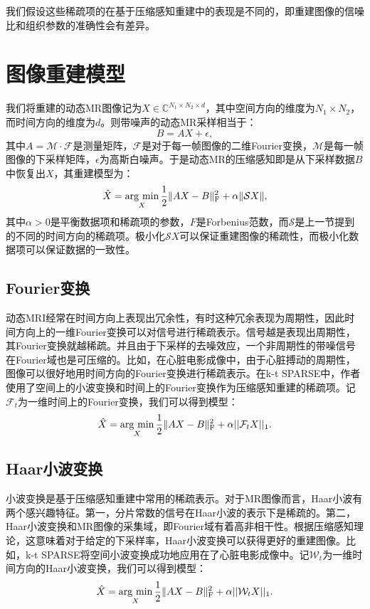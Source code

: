 我们假设这些稀疏项的在基于压缩感知重建中的表现是不同的，即重建图像的信噪比和组织参数的准确性会有差异。

\section{图像重建模型}
我们将重建的动态MR图像记为$X\in \mathbb{C}^{N_1\times N_2\times d}$，其中空间方向的维度为$N_1\times N_2$，而时间方向的维度为$d$。则带噪声的动态MR采样相当于：
$$B=AX+\epsilon,$$
其中$A=\mathcal{M}\cdot \mathcal{F}$是测量矩阵，$\mathcal{F}$是对于每一帧图像的二维Fourier变换，$\mathcal{M}$是每一帧图像的下采样矩阵，$\epsilon$为高斯白噪声。于是动态MR的压缩感知即是从下采样数据$B$中恢复出$X$，其重建模型为：
\begin{equation}
\hat{X} = \argmin_X \frac{1}{2}\|AX-B\|_\mathrm{F}^2 + \alpha\|\mathcal{S}X\|,
\end{equation}
其中$\alpha>0$是平衡数据项和稀疏项的参数，$F$是Forbenius范数，而$\mathcal{S}$是上一节提到的不同的时间方向的稀疏项。极小化$\mathcal{S}X$可以保证重建图像的稀疏性，而极小化数据项可以保证数据的一致性。

\subsection{Fourier变换}
动态MRI经常在时间方向上表现出冗余性，有时这种冗余表现为周期性，因此时间方向上的一维Fourier变换可以对信号进行稀疏表示。信号越是表现出周期性，其Fourier变换就越稀疏。并且由于下采样的去噪效应，一个非周期性的带噪信号在Fourier域也是可压缩的。比如，在心脏电影成像中，由于心脏搏动的周期性，图像可以很好地用时间方向的Fourier变换进行稀疏表示。在k-t SPARSE\cite{Lustig2010Sparse}中，作者使用了空间上的小波变换和时间上的Fourier变换作为压缩感知重建的稀疏项。记$\mathcal{F}_t$为一维时间上的Fourier变换，我们可以得到模型：
\begin{equation}
\hat{X} = \argmin_X \frac{1}{2}\|AX-B\|_\mathrm{F}^2 + \alpha ||\mathcal{F}_t X||_1.
\end{equation}

\subsection{Haar小波变换}
小波变换是基于压缩感知重建中常用的稀疏表示。对于MR图像而言，Haar小波有两个感兴趣特征。第一，分片常数的信号在Haar小波的表示下是稀疏的。第二，Haar小波变换和MR图像的采集域，即Fourier域有着高非相干性。根据压缩感知理论，这意味着对于给定的下采样率，Haar小波变换可以获得更好的重建图像。比如，k-t SPARSE\cite{Lustig2010Sparse}将空间小波变换成功地应用在了心脏电影成像中。记$\mathcal{W}_t$为一维时间方向的Haar小波变换，我们可以得到模型：
\begin{equation}
\hat{X} = \argmin_X \frac{1}{2}\|AX-B\|_\mathrm{F}^2 + \alpha ||\mathcal{W}_t X||_1.
\end{equation}

